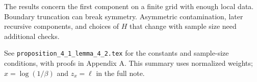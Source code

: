 \documentclass[11pt]{article}
\begin{document}
The results concern the first component on a finite grid with enough local
data.  Boundary truncation can break symmetry.  Asymmetric contamination,
later recursive components, and choices of \(H\) that change with sample
size need additional checks.

{\small See \texttt{proposition\_4\_1\_lemma\_4\_2.tex} for the constants
and sample-size conditions, with proofs in Appendix A.  This summary uses
normalized weights; \(x=\log(1/\beta)\) and \(z_x=\ell\) in the full note.}
\end{document}
